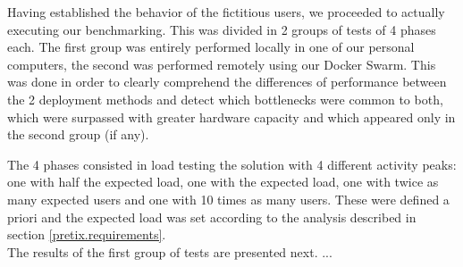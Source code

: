 \documentclass[12pt]{article}
\begin{document}

Having established the behavior of the fictitious users, we proceeded to actually executing our benchmarking.
This was divided in 2 groups of tests of 4 phases each.
The first group was entirely performed locally in one of our personal computers, the second was performed remotely using our Docker Swarm.
This was done in order to clearly comprehend the differences of performance between the 2 deployment methods and detect which bottlenecks were common to both, 
which were surpassed with greater hardware capacity and which appeared only in the second group (if any).

The 4 phases consisted in load testing the solution with 4 different activity peaks: one with half the expected load, one with the expected load, one with 
twice as many expected users and one with 10 times as many users.
These were defined a priori and the expected load was set according to the analysis described in section \ref{pretix.requirements}. \\

The results of the first group of tests are presented next.
... \\











\end{document}
